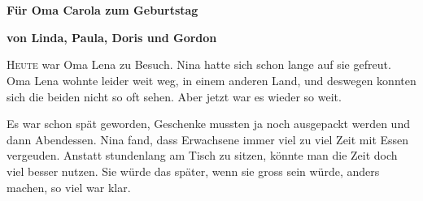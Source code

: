 \pagestyle{empty}
\section*{}
\centerline{\Huge \color{red}\SixFlowerPetalDotted}
\vspace{13pt}
\centerline{\bf \large\color{red}Für Oma Carola zum Geburtstag }
\vspace{13pt}
\centerline{\bf \color{red} von Linda, Paula, Doris und Gordon}
\vspace{13pt}
\centerline{\huge \color{red}\SixFlowerPetalDotted}
\vspace{13pt}
\centerline{\LARGE \color{red}\SixFlowerPetalDotted}
\vspace{13pt}
\centerline{\Large \color{red}\SixFlowerPetalDotted}
\vspace{13pt}
\centerline{\large \color{red}\SixFlowerPetalDotted}
\vspace{13pt}
\centerline{\normalsize \color{red}\SixFlowerPetalDotted}
\vspace{13pt}
\centerline{\small \color{red}\SixFlowerPetalDotted}
\vspace{13pt}
\centerline{\footnotesize \color{red}\SixFlowerPetalDotted}
\vspace{13pt}
\centerline{\scriptsize \color{red}\SixFlowerPetalDotted}
\vspace{13pt}
\centerline{\tiny \color{red}\SixFlowerPetalDotted}

\newpage
\pagestyle{scrheadings}
\lettrine[lines=3]{\color{red}H}{eute} war Oma Lena zu Besuch. Nina hatte sich schon lange auf sie gefreut. Oma Lena wohnte leider weit weg, in einem anderen Land, und deswegen konnten sich die beiden nicht so oft sehen. Aber jetzt war es wieder so weit. 

Es war schon spät geworden, Geschenke mussten ja noch ausgepackt werden und dann Abendessen. Nina fand, dass Erwachsene immer viel zu viel Zeit mit Essen vergeuden. Anstatt stundenlang am Tisch zu sitzen, könnte man die Zeit doch viel besser nutzen. Sie würde das später, wenn sie gross sein würde, anders machen, so viel war klar.


